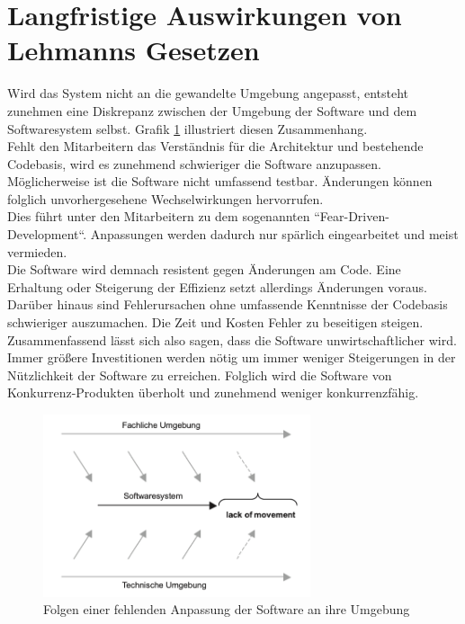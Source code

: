 \section{Langfristige Auswirkungen von Lehmanns Gesetzen}
Wird das System nicht an die gewandelte Umgebung angepasst, entsteht zunehmen eine Diskrepanz zwischen der Umgebung der Software und dem Softwaresystem selbst. Grafik \ref{fig:fehlendeVerbesserung} illustriert diesen Zusammenhang.\\
Fehlt den Mitarbeitern das Verständnis für die Architektur und bestehende Codebasis, wird es zunehmend schwieriger die Software anzupassen. Möglicherweise ist die Software nicht umfassend testbar. 
Änderungen können folglich unvorhergesehene Wechselwirkungen hervorrufen. \cite{daniel_kramer_legacy-software_2020} \\
Dies führt unter den Mitarbeitern zu dem sogenannten “Fear-Driven-Development“\cite{daniel_kramer_legacy-software_2020}. Anpassungen werden dadurch nur spärlich eingearbeitet und meist vermieden.\\  
Die Software wird demnach resistent gegen Änderungen am Code. Eine Erhaltung oder Steigerung der Effizienz setzt allerdings Änderungen voraus. 
Darüber hinaus sind Fehlerursachen ohne umfassende Kenntnisse der Codebasis schwieriger auszumachen. Die Zeit und Kosten Fehler zu beseitigen steigen.\\
Zusammenfassend lässt sich also sagen, dass die Software unwirtschaftlicher wird. Immer größere Investitionen werden nötig um immer weniger Steigerungen in der Nützlichkeit der Software zu erreichen. Folglich wird die Software von Konkurrenz-Produkten überholt und zunehmend weniger konkurrenzfähig.
\begin{figure}[bth] 
  \centering
  \includegraphics[width=0.7\textwidth]{Chapters/2-Lehmanns-Gesetze/images/fehlendeVerbesserung.png}
  \caption{Folgen einer fehlenden Anpassung der Software an ihre Umgebung \cite{bommer_softwarewartung_2016}}
  \label{fig:fehlendeVerbesserung}
\end{figure}


